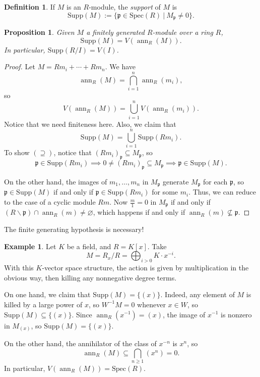 \documentclass{amsart}[12pt]
\def\ann{\operatorname{ann}}
\newcommand{\p}{{\mathfrak p}}
\numberwithin{equation}{section}
\theoremstyle{plain} %
\newtheorem{proposition}[equation]{Proposition}
\theoremstyle{definition}
\newtheorem{definition}[equation]{Definition}
\newtheorem{example}[equation]{Example}
\theoremstyle{remark}
\newcommand{\Spec}{\mathrm{Spec}}
\newcommand{\Supp}{\mathrm{Supp}}
\begin{document}
\begin{definition}
	If $M$ is an $R$-module, the {\em support} of $M$\index{$\Supp(M)$} is 
	$$\Supp(M):=\{ \p \in \Spec(R) \ | \ M_{\p}\neq 0\}.$$
\end{definition}




\begin{proposition}\label{supp v ann}
	Given $M$ a finitely generated $R$-module over a ring $R$, 
	$$\Supp(M)=V(\ann_R(M)).$$ 
	In particular, $\Supp(R/I)=V(I)$.
\end{proposition}
\begin{proof}
	Let $M= R m_i + \cdots + R m_n$. We have 
	$$\ann_R(M)=\bigcap_{i=1}^n \ann_R(m_i),$$ 
	so 
	$$V(\ann_R(M))=\bigcup_{i=1}^n V( \ann_R(m_i)).$$ 
	Notice that we need finiteness here.
Also, we claim that 
$$\Supp(M) = \bigcup_{i=1}^n \Supp(R m_i).$$ 
To show $(\supseteq)$, notice that $(R m_i)_{\p} \subseteq M_{\p}$, so
$$\p \in \Supp(R m_i) \implies 0 \neq (R m_i)_\p \subseteq M_\p \implies \p \in \Supp(M).$$

On the other hand, the images of $m_1, \ldots, m_n$ in $M_\p$ generate $M_\p$ for each $\p$, so $\p \in \Supp(M)$ if and only if $\p \in \Supp(R m_i)$ for some $m_i$. Thus, we can reduce to the case of a cyclic module $R m$. Now $\frac{m}{1}=0$ in $M_\p$ if and only if $(R\smallsetminus \p) \cap \ann_R (m) \neq \varnothing$, which happens if and only if $ \ann_R (m)  \not\subseteq \p$.
\end{proof}

The finite generating hypothesis is necessary!

\begin{example}
	Let $K$ be a field, and $R=K[x]$. Take 
	$$M=R_x / R = \bigoplus_{i>0} K \cdot x^{-i}.$$ 
	With this $K$-vector space structure, the action is given by multiplication in the obvious way, then killing any nonnegative degree terms. 
	
	On one hand, we claim that $\Supp(M) = \{(x)\}$. Indeed, any element of $M$ is killed by a large power of $x$, so $W^{-1}M=0$ whenever $x \in W$, so $\Supp(M) \subseteq \{ (x)\}$. Since $\ann_R(x^{-1}) = (x)$, the image of $x^{-1}$ is nonzero in $M_{(x)}$, so $\Supp(M) = \{(x)\}$.
		
	On the other hand, the annihilator of the class of $x^{-n}$ is $x^n$, so 
	$$\ann_R(M) \subseteq \bigcap_{n \geqslant 1}(x^n) = 0.$$
	In particular, $V(\ann_R(M)) = \Spec(R)$.
\end{example}
\end{document}
